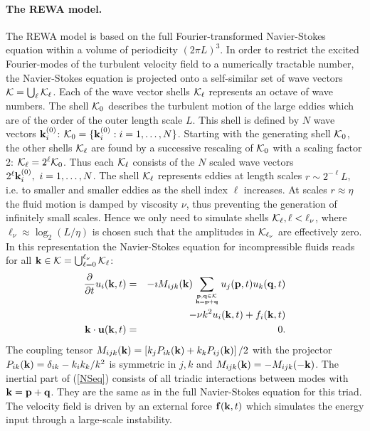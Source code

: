 \documentclass[dc]{svjour}
\begin{document}
\paragraph{The REWA model.}
The REWA model
\cite{eggers91a,grossmann94a} is based on the full Fourier-transformed
Navier-Stokes equation within a volume of periodicity $(2\pi L)^{3}$. In order
to restrict the excited Fourier-modes of the turbulent velocity field
to a numerically tractable number, the Navier-Stokes equation is
projected
onto a self-similar set of wave vectors ${\cal K}=\bigcup_{\ell}{\cal
  K}_{\ell}$. Each of the wave vector shells ${\cal K}_{\ell}$ represents
an octave of wave numbers. The shell ${\cal K}_{0}$ describes
the turbulent
motion of the large eddies which are of the order of the outer length scale
$L$. This shell is defined by $N$ wave vectors ${\bf k}^{(0)}_{i}$: ${\cal
  K}_{0}=\{{\bf k}^{(0)}_{i}:i=1,\dots,N\}$.  Starting with the generating
shell ${\cal K}_{0}$, the other shells ${\cal K}_{\ell}$ are found by a
successive rescaling of ${\cal K}_{0}$ with a scaling factor 2: ${\cal
  K}_{\ell}=2^{\ell} {\cal K}_{0}$. Thus each ${\cal K}_{\ell}$
consists of the $N$ scaled wave vectors $ 2^{\ell}{\bf k}_{i}^{(0)},\
i=1,\dots,N$. The shell ${\cal K}_{\ell}$ represents eddies at length scales
$r\sim 2^{-\ell}L$, i.e. to smaller and smaller eddies as the shell index
$\ell$ increases.
At scales $r \approx \eta$ the fluid motion is damped by
viscosity $\nu$, thus preventing the generation of infinitely
small scales. Hence we only need to simulate shells ${\cal K}_{\ell},
\ell < \ell_{\nu}$, where $\ell_{\nu} \approx \log_2(L/\eta)$
is chosen such that the amplitudes in ${\cal K}_{\ell_{\nu}}$ are
effectively zero. In this representation the Navier-Stokes equation for
incompressible fluids reads for all ${\bf k}\in {\cal
  K}=\bigcup_{\ell=0}^{\ell_{\nu}}{\cal K}_{\ell}$:
  \begin{eqnarray}
  \label{incompNSeq}
    \frac{\partial}{\partial t}u_{i}({\bf k},t)&=&
       -\imath M_{ijk}({\bf k})\sum_{
      {\bf p},{\bf q}\in{\cal K}\atop {\bf k}={\bf p}+{\bf q}} u_{j}({\bf
      p},t)u_{k}({\bf q},t)\nonumber\\ &&
      -\nu k^{2}u_{i}({\bf k},t)+f_{i}({\bf
      k},t)\label{NSeq}\\
    {\bf k}\cdot {\bf u}({\bf k},t)&=&0\label{compress} .
  \end{eqnarray}
%
The coupling tensor $M_{ijk}({\bf k})=\left[k_{j}P_{ik}({\bf
  k})+k_{k}P_{ij}({\bf k})\right]/2$ with the projector $P_{ik}({\bf
  k})=\delta_{ik}-k_{i}k_{k}/k^{2}$ is symmetric in $j,k$ and $M_{ijk}({\bf
  k})=-M_{ijk}(-{\bf k})$. The inertial part of (\ref{NSeq}) consists
of all triadic interactions between modes with ${\bf k}={\bf p}+{\bf q}$.
They are the same as in the full Navier-Stokes equation for this triad.
The velocity field is driven by an external force ${\bf f}({\bf
  k},t)$ which simulates the energy input through a large-scale instability.
\end{document}
